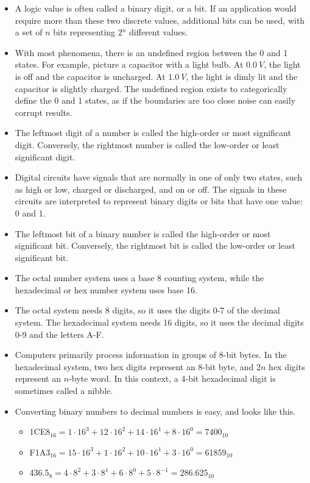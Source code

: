 \documentclass[10pt,a4paper]{article}
\begin{document}
\begin{itemize}
\item A logic value is often called a binary digit, or a bit. If an application would require more than these two discrete values, additional bits can be used, with a set of $n$ bits representing 2$^n$ different values. 
\item With most phenomena, there is an undefined region between the 0 and 1 states. For example, picture a capacitor with a light bulb. At $\SI{0.0}{V}$, the light is off and the capacitor is uncharged. At $\SI{1.0}{V}$, the light is dimly lit and the capacitor is slightly charged. The undefined region exists to categorically define the 0 and 1 states, as if the boundaries are too close noise can easily corrupt results. 
\item The leftmost digit of a number is called the high-order or most significant digit. Conversely, the rightmost number is called the low-order or least significant digit. 
\item Digital circuits have signals that are normally in one of only two states, such as high or low, charged or discharged, and on or off. The signals in these circuits are interpreted to represent binary digits or bits that have one value: 0 and 1. 
\item The leftmost bit of a binary number is called the high-order or most significant bit. Conversely, the rightmost bit is called the low-order or least significant bit.
\item The octal number system uses a base 8 counting system, while the hexadecimal or hex number system uses base 16. 
\item The octal system needs 8 digits, so it uses the digits 0-7 of the decimal system. The hexadecimal system needs 16 digits, so it uses the decimal digits 0-9 and the letters A-F.
\item Computers primarily process information in groups of 8-bit bytes. In the hexadecimal system, two hex digits represent an 8-bit byte, and 2$n$ hex digits represent an $n$-byte word. In this context, a 4-bit hexadecimal digit is sometimes called a nibble. 
\item Converting binary numbers to decimal numbers is easy, and looks like this.
\begin{itemize}
\item 1CE8$_{16}=1\cdot16^3+12\cdot16^2+14\cdot16^1+8\cdot16^0=7400_{10}$
\item F1A3$_{16}=15\cdot16^3+1\cdot16^2+10\cdot16^1+3\cdot16^0=61859_{10}$
\item 436.5$_{8}=4\cdot8^2+3\cdot8^1+6\cdot8^0+5\cdot8^{-1}=286.625_{10}$

\end{itemize}
\end{itemize}
\end{document}
